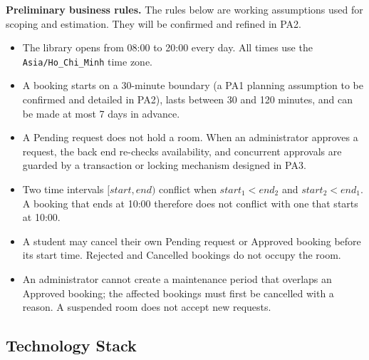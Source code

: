 \textbf{Preliminary business rules.} The rules below are working assumptions
used for scoping and estimation. They will be confirmed and refined in PA2.
\begin{itemize}[leftmargin=*,itemsep=2pt]
  \item The library opens from 08:00 to 20:00 every day. All times use the
        \texttt{Asia/Ho\_Chi\_Minh} time zone.
  \item A booking starts on a 30-minute boundary (a PA1 planning assumption
        to be confirmed and detailed in PA2), lasts between 30 and 120 minutes,
        and can be made at most 7 days in advance.
  \item A Pending request does not hold a room. When an administrator approves
        a request, the back end re-checks availability, and concurrent approvals
        are guarded by a transaction or locking mechanism designed in PA3.
  \item Two time intervals $[\mathit{start},\mathit{end})$ conflict when
        $\mathit{start}_1 < \mathit{end}_2$ and $\mathit{start}_2 < \mathit{end}_1$.
        A booking that ends at 10:00 therefore does not conflict with one that
        starts at 10:00.
  \item A student may cancel their own Pending request or Approved booking
        before its start time. Rejected and Cancelled bookings do not occupy
        the room.
  \item An administrator cannot create a maintenance period that overlaps an
        Approved booking; the affected bookings must first be cancelled with
        a reason. A suspended room does not accept new requests.
\end{itemize}

\subsection{Technology Stack}


